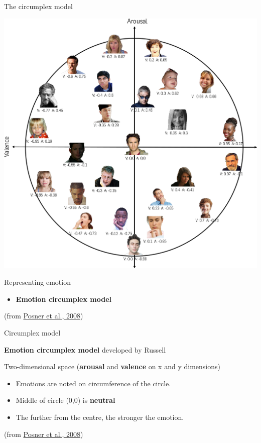 \documentclass[compress]{beamer}
\begin{document}
{
\begin{frame}{The circumplex model}
    \begin{center}
        \includegraphics[width=0.65\linewidth]{AffectNet_circumplex}
    \end{center}
\end{frame}
}

\begin{frame}{Representing emotion}

\begin{itemize}

\item \textbf{Emotion circumplex model}
\end{itemize}

(from \href{http://www.ncbi.nlm.nih.gov/pmc/articles/PMC2367156/}{Posner
et al., 2008})

\end{frame}

\begin{frame}{Circumplex model}

\textbf{Emotion circumplex model} developed by Russell

Two-dimensional space (\textbf{arousal} and \textbf{valence} on x and y
dimensions)

\begin{itemize}

\item Emotions are noted on circumference of the circle.
\item Middle of circle (0,0) is \textbf{neutral}
\item The further from the centre, the stronger the emotion.
\end{itemize}

(from \href{http://www.ncbi.nlm.nih.gov/pmc/articles/PMC2367156/}{Posner
et al., 2008})

\end{frame}
\end{document}
